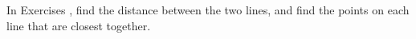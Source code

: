 {\noindent In Exercises}
{, find the distance between the two lines, and find the points on each line that are closest together.
}
